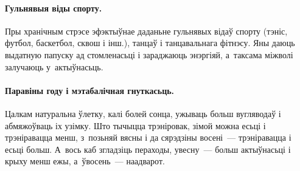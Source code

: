 \paragraph{Гульнявыя віды спорту.}
Пры хранічным стрэсе эфэктыўнае даданьне гульнявых відаў спорту (тэніс, футбол, баскетбол, сквош і інш.), танцаў і танцавальнага фітнэсу. Яны даюць выдатную папуску ад стомленасьці і зараджаюць энэргіяй, а~таксама міжволі залучаюць у~актыўнасьць.


\paragraph{Паравіны году і мэтабалічная гнуткасьць.}
Цалкам натуральна ўлетку, калі болей сонца, ужываць больш вугляводаў і абмяжоўваць іх узімку. Што тычыцца трэніровак, зімой можна есьці і трэніравацца менш, з~позьняй вясны і да сярэдзіны восені~--- трэніравацца і есьці больш. А~вось каб згладзіць пераходы, увесну~--- больш актыўнасьці і крыху менш ежы, а~ўвосень~--- наадварот.
